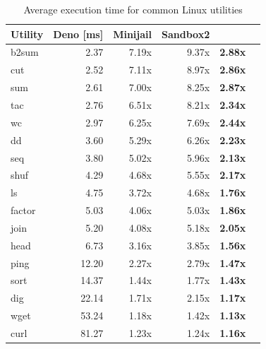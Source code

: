 \begin{table}[!t]
	\centering
    \setlength{\tabcolsep}{3mm}
	\begin{tabular*}{0.8\columnwidth}{l r r r r r}
		\toprule
		{\bf Utility} & {\bf Deno \scriptsize{[ms]}} & {\bf Minijail} & {\bf Sandbox2} & {\bf \natisand}\\
		\midrule
		b2sum   & 2.37      & 7.19x     & 9.37x & \bf{2.88x}    \\
		cut     & 2.52      & 7.11x     & 8.97x & \bf{2.86x}    \\
		sum     & 2.61      & 7.00x     & 8.25x & \bf{2.87x}    \\
		tac     & 2.76      & 6.51x     & 8.21x & \bf{2.34x}    \\
		wc      & 2.97      & 6.25x     & 7.69x & \bf{2.44x}    \\
		dd      & 3.60      & 5.29x     & 6.26x & \bf{2.23x}    \\
		seq     & 3.80      & 5.02x     & 5.96x & \bf{2.13x}    \\
		shuf    & 4.29      & 4.68x     & 5.55x & \bf{2.17x}    \\
		ls      & 4.75      & 3.72x     & 4.68x & \bf{1.76x}    \\
		factor  & 5.03      & 4.06x     & 5.03x & \bf{1.86x}    \\
		join    & 5.20      & 4.08x     & 5.18x & \bf{2.05x}    \\
		head    & 6.73      & 3.16x     & 3.85x & \bf{1.56x}    \\
		ping    & 12.20     & 2.27x     & 2.79x & \bf{1.47x}    \\
		sort    & 14.37     & 1.44x     & 1.77x & \bf{1.43x}    \\
		dig     & 22.14     & 1.71x     & 2.15x & \bf{1.17x}    \\
		wget    & 53.24     & 1.18x     & 1.42x & \bf{1.13x}    \\
		curl    & 81.27     & 1.23x     & 1.24x & \bf{1.16x}    \\
		\bottomrule
	\end{tabular*}
	\caption{\label{table:common-linux-utils} Average execution time
	  for common Linux utilities}
\end{table}
%
